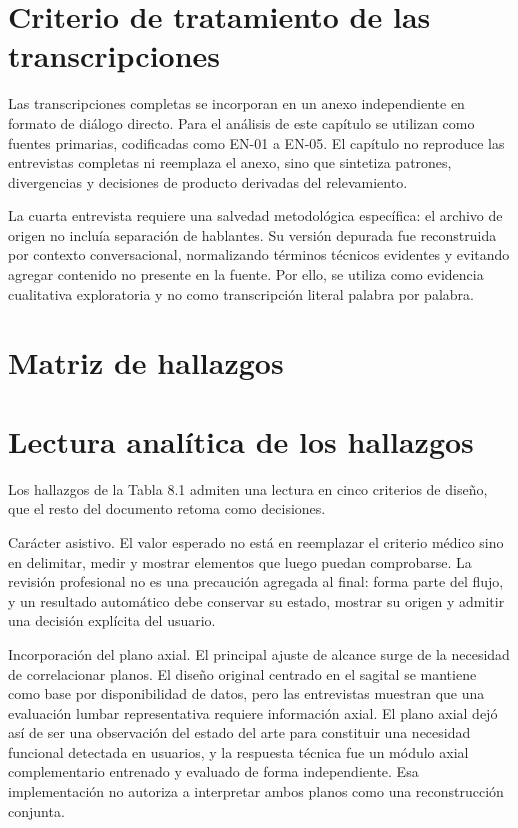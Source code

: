 \section{Criterio de tratamiento de las transcripciones}

Las transcripciones completas se incorporan en un anexo independiente en formato de diálogo directo. Para el análisis de este capítulo se utilizan como fuentes primarias, codificadas como EN-01 a EN-05. El capítulo no reproduce las entrevistas completas ni reemplaza el anexo, sino que sintetiza patrones, divergencias y decisiones de producto derivadas del relevamiento.

La cuarta entrevista requiere una salvedad metodológica específica: el archivo de origen no incluía separación de hablantes. Su versión depurada fue reconstruida por contexto conversacional, normalizando términos técnicos evidentes y evitando agregar contenido no presente en la fuente. Por ello, se utiliza como evidencia cualitativa exploratoria y no como transcripción literal palabra por palabra.

\section{Matriz de hallazgos}


\section{Lectura analítica de los hallazgos}

Los hallazgos de la Tabla 8.1 admiten una lectura en cinco criterios de diseño, que el resto del documento retoma como decisiones.

Carácter asistivo. El valor esperado no está en reemplazar el criterio médico sino en delimitar, medir y mostrar elementos que luego puedan comprobarse. La revisión profesional no es una precaución agregada al final: forma parte del flujo, y un resultado automático debe conservar su estado, mostrar su origen y admitir una decisión explícita del usuario.

Incorporación del plano axial. El principal ajuste de alcance surge de la necesidad de correlacionar planos. El diseño original centrado en el sagital se mantiene como base por disponibilidad de datos, pero las entrevistas muestran que una evaluación lumbar representativa requiere información axial. El plano axial dejó así de ser una observación del estado del arte para constituir una necesidad funcional detectada en usuarios, y la respuesta técnica fue un módulo axial complementario entrenado y evaluado de forma independiente. Esa implementación no autoriza a interpretar ambos planos como una reconstrucción conjunta.


